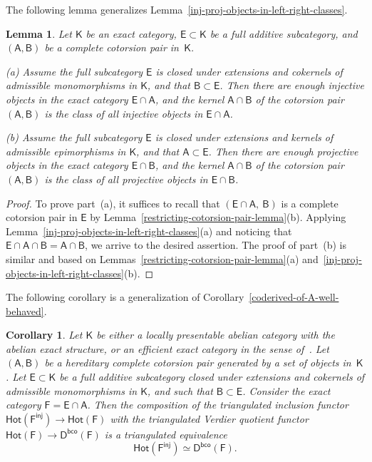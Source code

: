 \documentclass[12pt,a4paper]{amsart}
\newcommand{\+}{\nobreakdash-}
\renewcommand{\:}{\colon}
\newcommand{\rarrow}{\longrightarrow}
\newcommand{\sA}{\mathsf A}
\newcommand{\sB}{\mathsf B}
\newcommand{\sD}{\mathsf D}
\newcommand{\sE}{\mathsf E}
\newcommand{\sF}{\mathsf F}
\newcommand{\sK}{\mathsf K}
\newcommand{\Hot}{\mathsf{Hot}}
\newcommand{\inj}{\mathsf{inj}}
\newcommand{\bco}{\mathsf{bco}}
\theoremstyle{plain}
\newtheorem{lem}[thm]{Lemma}
\newtheorem{cor}[thm]{Corollary}
\theoremstyle{definition}
\begin{document}
 The following lemma generalizes
Lemma~\ref{inj-proj-objects-in-left-right-classes}.

\begin{lem} \label{inj-proj-objects-in-intersected-classes}
 Let\/ $\sK$ be an exact category, $\sE\subset\sK$ be a full additive
subcategory, and $(\sA,\sB)$ be a complete cotorsion pair in~$\sK$. \par
\textup{(a)} Assume the full subcategory\/ $\sE$ is closed under
extensions and cokernels of admissible monomorphisms in\/ $\sK$, and
that\/ $\sB\subset\sE$.
 Then there are enough injective objects in the exact category\/
$\sE\cap\sA$, and the kernel\/ $\sA\cap\sB$ of the cotorsion pair
$(\sA,\sB)$ is the class of all injective objects in\/ $\sE\cap\sA$.
\par
\textup{(b)} Assume the full subcategory\/ $\sE$ is closed under
extensions and kernels of admissible epimorphisms in\/ $\sK$, and
that\/ $\sA\subset\sE$.
 Then there are enough projective objects in the exact category\/
$\sE\cap\sB$, and the kernel\/ $\sA\cap\sB$ of the cotorsion pair
$(\sA,\sB)$ is the class of all projective objects in\/ $\sE\cap\sB$.
\end{lem}

\begin{proof}
 To prove part~(a), it suffices to recall that $(\sE\cap\sA,\>\sB)$
is a complete cotorsion pair in $\sE$ by
Lemma~\ref{restricting-cotorsion-pair-lemma}(b).
 Applying Lemma~\ref{inj-proj-objects-in-left-right-classes}(a)
and noticing that $\sE\cap\sA\cap\sB=\sA\cap\sB$, we arrive to
the desired assertion.
 The proof of part~(b) is similar and based on
Lemmas~\ref{restricting-cotorsion-pair-lemma}(a)
and~\ref{inj-proj-objects-in-left-right-classes}(b).
\end{proof}

 The following corollary is a generalization
of Corollary~\ref{coderived-of-A-well-behaved}.

\begin{cor} \label{coderived-of-E-intersect-A-well-behaved}
 Let\/ $\sK$ be either a locally presentable abelian category with
the abelian exact structure, or an efficient exact category in
the sense of\/~\cite{Sto-ICRA}.
 Let $(\sA,\sB)$ be a hereditary complete cotorsion pair generated
by a set of objects in\/~$\sK$.
 Let\/ $\sE\subset\sK$ be a full additive subcategory closed under
extensions and cokernels of admissible monomorphisms in\/ $\sK$,
and such that\/ $\sB\subset\sE$.
 Consider the exact category\/ $\sF=\sE\cap\sA$.
 Then the composition of the triangulated inclusion functor\/
$\Hot(\sF^\inj)\rarrow\Hot(\sF)$ with the triangulated Verdier
quotient functor\/ $\Hot(\sF)\rarrow\sD^\bco(\sF)$ is a triangulated
equivalence
$$
 \Hot(\sF^\inj)\simeq\sD^\bco(\sF).
$$
\end{cor}
\end{document}
